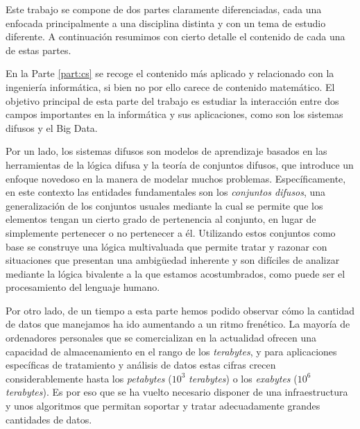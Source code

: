 %
%
%

Este trabajo se compone de dos partes claramente diferenciadas, cada una enfocada principalmente a una disciplina distinta y con un tema de estudio diferente. A continuación resumimos con cierto detalle el contenido de cada una de estas partes.

En la Parte \ref{part:cs} se recoge el contenido más aplicado y relacionado con la ingeniería informática, si bien no por ello carece de contenido matemático. El objetivo principal de esta parte del trabajo es estudiar la interacción entre dos campos importantes en la informática y sus aplicaciones, como son los sistemas difusos y el Big Data.

Por un lado, los sistemas difusos son modelos de aprendizaje basados en las herramientas de la lógica difusa y la teoría de conjuntos difusos, que introduce un enfoque novedoso en la manera de modelar muchos problemas. Específicamente, en este contexto las entidades fundamentales son los \textit{conjuntos difusos}, una generalización de los conjuntos usuales mediante la cual se permite que los elementos tengan un cierto grado de pertenencia al conjunto, en lugar de simplemente pertenecer o no pertenecer a él.
Utilizando estos conjuntos como base se construye una lógica multivaluada que permite tratar y razonar con situaciones que presentan una ambigüedad inherente y son difíciles de analizar mediante la lógica bivalente a la que estamos acostumbrados, como puede ser el procesamiento del lenguaje humano.

Por otro lado, de un tiempo a esta parte hemos podido observar cómo la cantidad de datos que manejamos ha ido aumentando a un ritmo frenético. La mayoría de ordenadores personales que se comercializan en la actualidad ofrecen una capacidad de almacenamiento en el rango de los \textit{terabytes}, y para aplicaciones específicas de tratamiento y análisis de datos estas cifras crecen considerablemente hasta los \textit{petabytes} ($10^3$ \textit{terabytes}) o los \textit{exabytes} ($10^6$ \textit{terabytes}). Es por eso que se ha vuelto necesario disponer de una infraestructura y unos algoritmos que permitan soportar y tratar adecuadamente grandes cantidades de datos.

